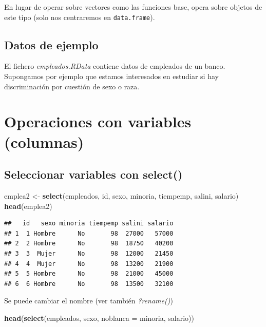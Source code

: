 \documentclass[
]{book}
\newenvironment{Shaded}{\begin{snugshade}}{\end{snugshade}}
\newcommand{\AttributeTok}[1]{\textcolor[rgb]{0.13,0.29,0.53}{#1}}
\newcommand{\FunctionTok}[1]{\textcolor[rgb]{0.13,0.29,0.53}{\textbf{#1}}}
\newcommand{\NormalTok}[1]{#1}
\newcommand{\OtherTok}[1]{\textcolor[rgb]{0.56,0.35,0.01}{#1}}
\begin{document}
En lugar de operar sobre vectores como las funciones base,
opera sobre objetos de este tipo (solo nos centraremos en \texttt{data.frame}).

\subsection{Datos de ejemplo}\label{datos-de-ejemplo}

El fichero \emph{empleados.RData} contiene datos de empleados de un banco.
Supongamos por ejemplo que estamos interesados en estudiar si hay
discriminación por cuestión de sexo o raza.

\section{Operaciones con variables (columnas)}\label{operaciones-con-variables-columnas}

\subsection{\texorpdfstring{Seleccionar variables con \textbf{select()}}{Seleccionar variables con select()}}\label{seleccionar-variables-con-select}

\begin{Shaded}
\begin{Highlighting}[]
\NormalTok{emplea2 }\OtherTok{\textless{}{-}} \FunctionTok{select}\NormalTok{(empleados, id, sexo, minoria, tiempemp, salini, salario)}
\FunctionTok{head}\NormalTok{(emplea2)}
\end{Highlighting}
\end{Shaded}

\begin{verbatim}
##   id   sexo minoria tiempemp salini salario
## 1  1 Hombre      No       98  27000   57000
## 2  2 Hombre      No       98  18750   40200
## 3  3  Mujer      No       98  12000   21450
## 4  4  Mujer      No       98  13200   21900
## 5  5 Hombre      No       98  21000   45000
## 6  6 Hombre      No       98  13500   32100
\end{verbatim}

Se puede cambiar el nombre (ver también \emph{?rename()})

\begin{Shaded}
\begin{Highlighting}[]
\FunctionTok{head}\NormalTok{(}\FunctionTok{select}\NormalTok{(empleados, sexo, }\AttributeTok{noblanca =}\NormalTok{ minoria, salario))}
\end{Highlighting}
\end{Shaded}
\end{document}
